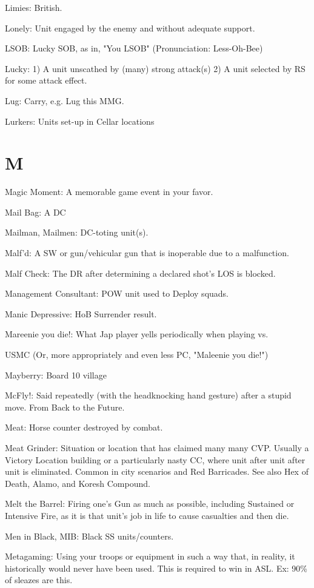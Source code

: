 \documentclass[letterpaper]{article}
\begin{document}
Limies: British.

Lonely: Unit engaged by the enemy and without adequate support.

LSOB: Lucky SOB, as in, "You LSOB" (Pronunciation: Less-Oh-Bee)

Lucky: 1) A unit unscathed by (many) strong attack(s) 2) A unit selected by RS for some attack effect.

Lug: Carry, e.g. Lug this MMG.

Lurkers: Units set-up in Cellar locations

\section{M}

Magic Moment: A memorable game event in your favor.

Mail Bag: A DC

Mailman, Mailmen: DC-toting unit(s).

Malf'd: A SW or gun/vehicular gun that is inoperable due to a malfunction.

Malf Check: The DR after determining a declared shot's LOS is blocked.

Management Consultant: POW unit used to Deploy squads.

Manic Depressive: HoB Surrender result.

Mareenie you die!: What Jap player yells periodically when playing vs.

USMC (Or, more appropriately and even less PC, "Maleenie you die!")

Mayberry: Board 10 village

McFly!: Said repeatedly (with the headknocking hand gesture) after a stupid move. From Back to the Future.

Meat: Horse counter destroyed by combat.

Meat Grinder: Situation or location that has claimed many many CVP. Usually a Victory Location building or a particularly nasty CC, where unit after unit after unit is eliminated. Common in city scenarios and Red Barricades. See also Hex of Death, Alamo, and Koresh Compound.

Melt the Barrel: Firing one's Gun as much as possible, including Sustained or Intensive Fire, as it is that unit's job in life to cause casualties and then die.

Men in Black, MIB: Black SS units/counters.

Metagaming: Using your troops or equipment in such a way that, in reality, it
historically would never have been used. This is required to win in ASL.  Ex:
90\% of sleazes are this.
\end{document}
